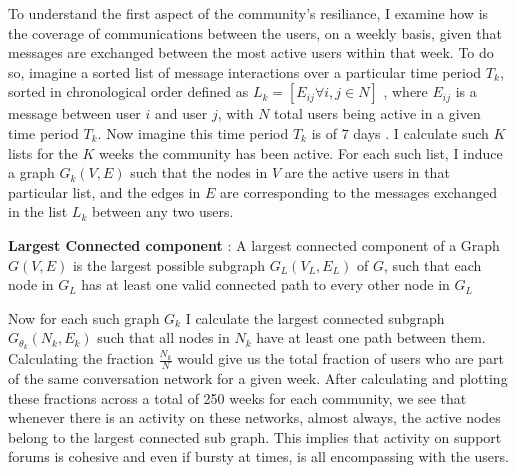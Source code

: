 To understand the first aspect of the community's resiliance, I examine how is the coverage of communications between the users, on a weekly basis, given that messages are exchanged between the most active users within that week. 
To do so, imagine a sorted list of message interactions over a particular time period $T_k$, sorted in chronological order defined as $L_k=[E_{ij} \forall i,j \in N]$ , where $E_{ij}$ is a message between user $i$ and user $j$, with $N$ total users being active in a given time period $T_k$. Now imagine this time period $T_k$ is of 7 days . I calculate such $K$ lists for the $K$ weeks the community has been active. For each such list, I induce a graph $G_k(V,E)$ such that the nodes in $V$ are the active users in that particular list, and the edges in $E$ are corresponding to the messages exchanged in the list $L_k$ between any two users. 
\begin{definition}
\textbf{Largest Connected component} : A largest connected component of a Graph $G(V,E)$ is the largest possible subgraph $G_L(V_L,E_L)$ of $G$, such that each node in $G_L$ has at least one valid connected path to every other node in $G_L$
\end{definition}
Now for each such graph $G_k$ I calculate the largest connected subgraph $G_{\theta_k}(N_k,E_k)$ such that all nodes in $N_k$ have at least one path between them. Calculating the fraction $\frac{N_k}{N}$ would give us the total fraction of users who are part of the same conversation network for a given week. After calculating and plotting these fractions across a total of 250 weeks for each community, we see that whenever there is an activity on these networks, almost always, the active nodes belong to the largest connected sub graph. This implies that activity on support forums is cohesive and even if bursty at times, is all encompassing with the users. 

